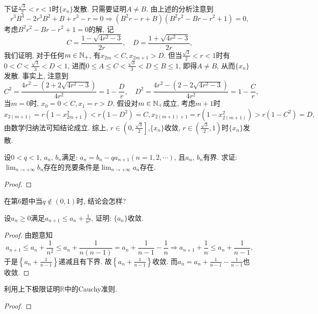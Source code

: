 \begin{quiza}
\begin{solution}
下证\(\frac{\sqrt{3}}{2}<r<1\)时\(\{x_n\}\)发散. 只需要证明\(A\ne B\). 由上述的分析注意到\[r^3B^4-2r^3B^2+B+r^3-r=0\Rightarrow (B^2r-r+B)(B^2r^2-Br-r^2+1)=0,\]
考虑\(B^2r^2-Br-r^2+1=0\)的解, 记\[C=\frac{1-\sqrt{4r^2-3}}{2r},\quad D=\frac{1+\sqrt{4r^2-3}}{2r},\]我们证明, 对于任何\(m\in\mathbb{N}_+\), 有\(x_{2m}<C,x_{2m+1}>D\). 但当\(\frac{\sqrt{3}}{2}<r<1\)时有\(0<C<\frac{\sqrt{3}}{3}<D<1\), 进而\(0\leqslant A\leqslant C<\frac{\sqrt{3}}{3}<D\leqslant B\leqslant 1\), 即得\(A\ne B\), 从而\(\{x_n\}\)发散. 事实上, 注意到\[
C^2=\frac{4r^2-\left(2+2\sqrt{4r^2-3}\right)}{4r^2}=1-\frac{D}{r},\quad D^2=\frac{4r^2-\left(2-2\sqrt{4r^2-3}\right)}{4r^2}=1-\frac{C}{r},
\]当\(m=0\)时, \(x_0=0<C,x_1=r>D.\) 假设对\(m\in\mathbb{N}_+\)成立, 考虑\(m+1\)时\[x_{2(m+1)}=r\left(1-x_{2m+1}^2\right)<r(1-D^2)=C,x_{2(m+1)+1}=r\left(1-x_{2(m+1)}^2\right)>r\left(1-C^2\right)=D,\]由数学归纳法可知结论成立. 综上, \(r\in\left(0,\frac{\sqrt{3}}{2}\right]\),\(\{x_n\}\)收敛, \(r\in\left(\frac{\sqrt{3}}{2},1\right)\)时\(\{x_n\}\)发散.
\end{solution}
\woe 设\(0<q<1,\,a_n,\,b_n\)满足: \(a_n=b_n-qa_{n+1}(n=1,2,\cdots)\), 且\(a_n,\,b_n\)有界. 求证: \(\lim_{n\rightarrow+\infty}b_n\)存在的充要条件是\(\lim_{n\rightarrow+\infty}a_n\)存在.
\begin{proof}

\end{proof}
\woe 在第6题中当\(q\notin (0,1)\)时, 结论会怎样?
\begin{solution}

\end{solution}
\woe 设\(a_{n}\geqslant 0\)满足\( a_{n+1}\leqslant a_n+\frac{1}{n^2}\), 证明: \(\{a_n\}\)收敛.
\begin{proof}
由题意知\[a_{n+1}\leqslant a_n+\frac{1}{n^2}\leqslant a_n+\frac{1}{n(n-1)}=a_{n}+\frac{1}{n-1}-\frac{1}{n}\Rightarrow a_{n+1}+\frac{1}{n}\leqslant a_{n}+\frac{1}{n-1},\]于是\(\left\lbrace a_n+\frac{1}{n-1}\right\rbrace\)递减且有下界. 故\(\left\lbrace a_n+\frac{1}{n-1}\right\rbrace\)收敛. 而\(a_n=a_n+\frac{1}{n-1}-\frac{1}{n-1}\)也收敛.
\end{proof}
\woe 利用上下极限证明\(\mathbb{R}\)中的Cauchy准则.
\begin{proof}

\end{proof}
\end{quiza}
